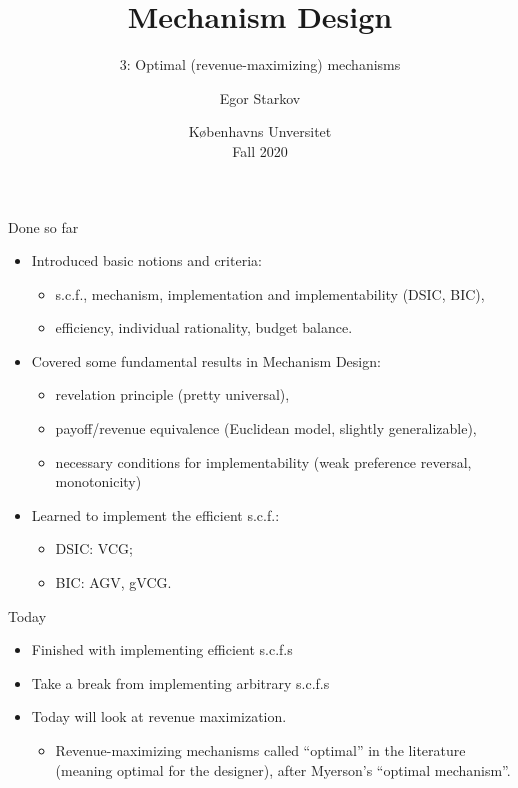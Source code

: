 \documentclass[english,10pt
,aspectratio=169
]{beamer}
\title{Mechanism Design}
\subtitle{3: Optimal (revenue-maximizing) mechanisms}
\author{Egor Starkov}
\date{K{\o}benhavns Unversitet \\
	Fall 2020}
\begin{document}
	\frame[plain]{\titlepage}



\begin{frame}{Done so far}
\begin{itemize}
	\item Introduced basic notions and criteria:
	\begin{itemize}
		\item s.c.f., mechanism, implementation and implementability (DSIC, BIC),
		\item efficiency, individual rationality, budget balance.
	\end{itemize}
	\pause
	\item Covered some fundamental results in Mechanism Design:
	\begin{itemize}
		\item revelation principle (pretty universal),
		\item payoff/revenue equivalence (Euclidean model, slightly generalizable),
		\item necessary conditions for implementability (weak preference reversal, monotonicity)
	\end{itemize}
	\pause
	\item Learned to implement the efficient s.c.f.:
	\begin{itemize}
		\item DSIC: VCG;
		\item BIC: AGV, gVCG.
	\end{itemize}
\end{itemize}
\end{frame}


\begin{frame}{Today}
\begin{itemize}
	\item Finished with implementing efficient s.c.f.s
	\item Take a break from implementing arbitrary s.c.f.s
	\item Today will look at revenue maximization.
	\begin{itemize}
		\item Revenue-maximizing mechanisms called ``optimal'' in the literature (meaning optimal for the designer), after Myerson's ``optimal mechanism''.
	\end{itemize}
\end{itemize}
\end{frame}
\end{document}
